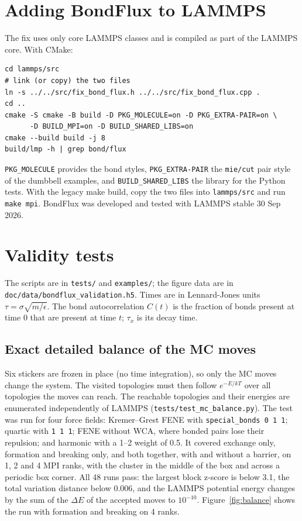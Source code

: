 \documentclass[a4paper]{tufte-handout}
\newcommand{\cmd}[1]{\texttt{#1}}
\begin{document}
\section{Adding BondFlux to LAMMPS}

The fix uses only core LAMMPS classes and is compiled as part of the LAMMPS core. With CMake:
\begin{lstlisting}
cd lammps/src
# link (or copy) the two files
ln -s ../../src/fix_bond_flux.h ../../src/fix_bond_flux.cpp .
cd ..
cmake -S cmake -B build -D PKG_MOLECULE=on -D PKG_EXTRA-PAIR=on \
      -D BUILD_MPI=on -D BUILD_SHARED_LIBS=on
cmake --build build -j 8
build/lmp -h | grep bond/flux
\end{lstlisting}
\cmd{PKG\_MOLECULE} provides the bond styles, \cmd{PKG\_EXTRA-PAIR} the \cmd{mie/cut} pair style of
the dumbbell examples, and \cmd{BUILD\_SHARED\_LIBS} the library for the Python tests. With the
legacy make build, copy the two files into \cmd{lammps/src} and run \cmd{make mpi}. BondFlux was
developed and tested with LAMMPS stable 30 Sep 2026.

\section{Validity tests}\label{sec:tests}

The scripts are in \cmd{tests/} and \cmd{examples/}; the figure data are in
\cmd{doc/data/bondflux\_validation.h5}. Times are in Lennard-Jones units
$\tau = \sigma\sqrt{m/\epsilon}$. The bond autocorrelation $C(t)$ is the fraction of bonds present
at time 0 that are present at time $t$; $\tau_x$ is its decay time.

\subsection{Exact detailed balance of the MC moves}

Six stickers are frozen in place (no time integration), so only the MC moves change the system.
The visited topologies must then follow $e^{-E/kT}$ over all topologies the moves can reach. The
reachable topologies and their energies are enumerated independently of LAMMPS
(\cmd{tests/test\_mc\_balance.py}). The test was run for four force fields: Kremer--Grest FENE with
\cmd{special\_bonds 0 1 1}; quartic with \cmd{1 1 1}; FENE without WCA, where bonded pairs lose
their repulsion; and harmonic with a 1--2 weight of 0.5. It covered exchange only, formation and
breaking only, and both together, with and without a barrier, on 1, 2 and 4 MPI ranks, with the
cluster in the middle of the box and across a periodic box corner. All 48 runs pass: the largest
block z-score is below 3.1, the total variation distance below 0.006, and the LAMMPS potential
energy changes by the sum of the $\Delta E$ of the accepted moves to $10^{-10}$.
Figure~\ref{fig:balance} shows the run with formation and breaking on 4 ranks.
\end{document}
